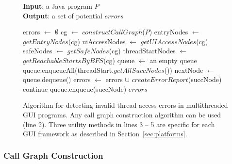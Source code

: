 \begin{figure}[t]
\textbf{Input}: a Java program $P$\\
\textbf{Output}: a set of potential $errors$\\
\vspace{-5mm}
\begin{algorithmic}[1]
\STATE errors $\leftarrow$ $\emptyset$
\STATE cg $\leftarrow$ $constructCallGraph$($P$)
\STATE entryNodes $\leftarrow$ $getEntryNodes$(cg)
\STATE uiAccessNodes $\leftarrow$ $getUIAccessNodes$(cg)
\STATE safeNodes $\leftarrow$ $getSafeNodes$(cg)
\STATE threadStartNodes $\leftarrow$ $getReachableStartsByBFS$(cg)
\STATE queue $\leftarrow$ an empty queue
\STATE queue.enqueueAll(threadStart.$getAllSuccNodes$())
\STATE nextNode $\leftarrow$ queue.dequeue()
\STATE errors $\leftarrow$ errors $\cup$ $createErrorReport$(succNode)
\STATE continue
\ELSE
\STATE queue.enqueue(succNode)
\ENDIF 
\ENDFOR
\ENDWHILE
\ENDFOR
\ENDFOR
\RETURN $errors$
\vspace{-2mm}
\end{algorithmic}
\caption{Algorithm for detecting invalid thread access errors in multithreaded GUI programs. 
Any call graph construction algorithm can be used (line 2).
Three utility methods in lines 3 -- 5 are specific for each GUI framework
 as described in Section~\ref{sec:platforms}.
} \label{fig:detectalgorithm}
\end{figure}


\subsubsection{Call Graph Construction}
\label{sec:cg}


